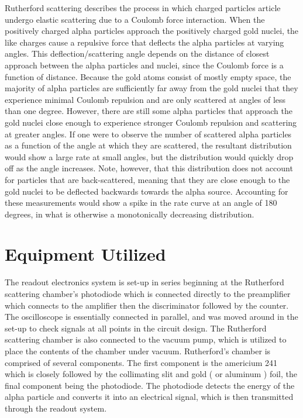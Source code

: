 \documentclass[a4paper]{article}
\begin{document}
\qq Rutherford scattering describes the process in which charged particles
article undergo elastic scattering due to a Coulomb force interaction. When the
positively charged alpha particles approach the positively charged gold nuclei,
the like charges cause a repulsive force that deflects the alpha particles at
varying angles. This deflection/scattering angle depends on the distance of
closest approach between the alpha particles and nuclei, since the Coulomb force
is a function of distance. Because the gold atoms consist of mostly empty space,
the majority of alpha particles are sufficiently far away from the gold nuclei
that they experience minimal Coulomb repulsion and are only scattered at angles
of less than one degree. However, there are still some alpha particles that
approach the gold nuclei close enough to experience stronger Coulomb repulsion
and scattering at greater angles. If one were to observe the number of scattered
alpha particles as a function of the angle at which they are scattered, the
resultant distribution would show a large rate at small angles, but the
distribution would quickly drop off as the angle increases. Note, however, that
this distribution does not account for particles that are back-scattered,
meaning that they are close enough to the gold nuclei to be deflected backwards
towards the alpha source. Accounting for these measurements would show a spike
in the rate curve at an angle of 180 degrees, in what is otherwise a
monotonically decreasing distribution.

\qq 

\qq 

\section{Equipment Utilized}

\qq The readout electronics system is set-up in series beginning at
the Rutherford scattering chamber's photodiode which is connected
directly to the preamplifier which connects to the amplifier then the
discriminator followed by the counter. The oscilloscope is essentially
connected in parallel, and was moved around in the set-up to check
signals at all points in the circuit design. The Rutherford scattering
chamber is also connected to the vacuum pump, which is utilized to
place the contents of the chamber under vacuum. Rutherford's chamber
is comprised of several components. The first component is the
americium 241 which is closely followed by the collimating slit and
gold ( or aluminum ) foil, the final component being the
photodiode. The photodiode detects the energy of the alpha particle
and converts it into an electrical signal, which is then transmitted
through the readout system.
\end{document}
